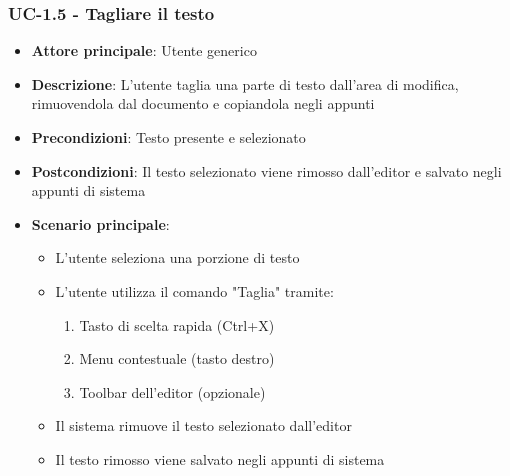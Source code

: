 \documentclass[11pt,a4paper]{article}
\begin{document}
\subsubsection{UC-1.5 - Tagliare il testo}
\begin{itemize}
    \item \textbf{Attore principale}: Utente generico
    \item \textbf{Descrizione}: L'utente taglia una parte di testo dall'area di modifica, rimuovendola dal documento e copiandola negli appunti
    \item \textbf{Precondizioni}: Testo presente e selezionato
    \item \textbf{Postcondizioni}: Il testo selezionato viene rimosso dall'editor e salvato negli appunti di sistema
    \item \textbf{Scenario principale}:
        \begin{itemize}
            \item L'utente seleziona una porzione di testo
            \item L'utente utilizza il comando "Taglia" tramite:
                \begin{enumerate}
                    \item Tasto di scelta rapida (Ctrl+X)
                    \item Menu contestuale (tasto destro)
                    \item Toolbar dell'editor (opzionale)
                \end{enumerate}
            \item Il sistema rimuove il testo selezionato dall'editor
            \item Il testo rimosso viene salvato negli appunti di sistema
        \end{itemize}
\end{itemize}
\end{document}
